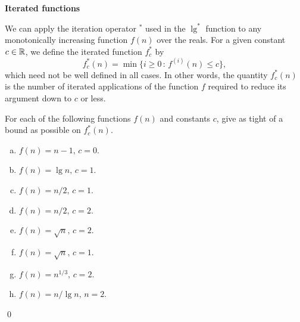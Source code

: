  \textbf{Iterated functions}

We can apply the iteration operator $^*$ used in the $\lg^*$ function to any monotonically increasing function $f(n)$ over the reals. For a given constant $c \in \mathbb{R}$, we define the iterated function $f_c^*$ by $$f_c^*(n) = \min\{i \geq 0 \, : \, f^{(i)}(n) \leq c\},$$ which need not be well defined in all cases. In other words, the quantity $f_c^*(n)$ is the number of iterated applications of the function $f$ required to reduce its argument down to $c$ or less.

For each of the following functions $f(n)$ and constants $c$, give as tight of a bound as possible on $f_c^*(n).$

\begin{enumerate}[(a)]
    \item $f(n) = n-1, \, c=0$.
    \item $f(n) = \lg n, \, c=1$.
    \item $f(n) = n/2, \, c=1$.
    \item $f(n) = n/2, \, c=2$.
    \item $f(n) = \sqrt{n}, \, c=2$.
    \item $f(n) = \sqrt{n}, \, c=1$.
    \item $f(n) = n^{1/3}, \, c=2$.
    \item $f(n) = n/\lg n, \, n=2$.
\end{enumerate}

\sol \qed